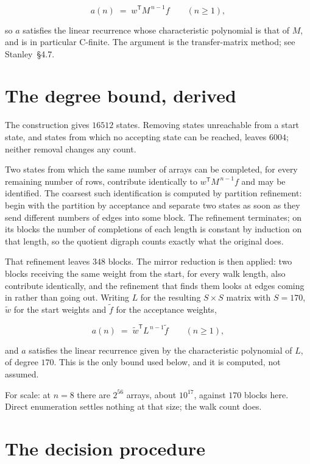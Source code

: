 \documentclass[11pt]{article}
\theoremstyle{definition}
\begin{document}
\[a(n) \;=\; w^{\mathsf T} M^{\,n-1} f \qquad (n \ge 1),\]

so $a$ satisfies the linear recurrence whose characteristic polynomial is that of $M$, and is in particular C-finite. The argument is the transfer-matrix method; see Stanley~\S4.7.

\section{The degree bound, derived}

The construction gives $16512$ states. Removing states unreachable from a start state, and states from which no accepting state can be reached, leaves $6004$; neither removal changes any count.

Two states from which the same number of arrays can be completed, for every remaining number of rows, contribute identically to $w^{\mathsf T}M^{\,n-1}f$ and may be identified. The coarsest such identification is computed by partition refinement: begin with the partition by acceptance and separate two states as soon as they send different numbers of edges into some block. The refinement terminates; on its blocks the number of completions of each length is constant by induction on that length, so the quotient digraph counts exactly what the original does.

That refinement leaves $348$ blocks. The mirror reduction is then applied: two blocks receiving the same weight from the start, for every walk length, also contribute identically, and the refinement that finds them looks at edges coming in rather than going out. Writing $L$ for the resulting $S \times S$ matrix with $S = 170$, $\tilde w$ for the start weights and $\tilde f$ for the acceptance weights,

\[a(n) \;=\; \tilde w^{\mathsf T} L^{\,n-1} \tilde f \qquad (n \ge 1),\]

and $a$ satisfies the linear recurrence given by the characteristic polynomial of $L$, of degree $170$. This is the only bound used below, and it is computed, not assumed.

For scale: at $n = 8$ there are $2^{56}$ arrays, about $10^{17}$, against $170$ blocks here. Direct enumeration settles nothing at that size; the walk count does.

\section{The decision procedure}
\end{document}
